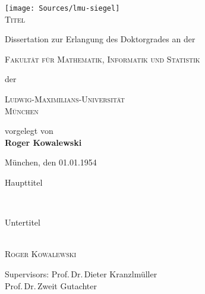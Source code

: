 
\begin{titlepage}
	\begin{center}
        \texttt{[image: Sources/lmu-siegel]}\\
        \vskip 1cm
		\textsc{\huge Titel}
                \vskip 1cm
                \begin{large}
                  Dissertation zur Erlangung des Doktorgrades an der\\[0.50cm]
                  \begin{Large}
                    \textsc{Fakultät für Mathematik, Informatik und Statistik}\\[0.50cm]
                  \end{Large}
                  der\\[0.50cm]
                  \begin{Large}
                    \textsc{Ludwig-Maximilians-Universität\\München}\par
                  \end{Large}
                \end{large}
		\vfill
                {\large vorgelegt von}\\[0.5cm]
                {\LARGE \bfseries Roger Kowalewski}
    \vskip 1cm
    \begin{small}
        München, den 01.01.1954
    \end{small}
	\end{center}
\end{titlepage}


\begin{titlepage}
  \phantom{}
  \vfill
  \begin{center}
    \begin{singlespace*}
    \begin{Huge}
     Haupttitel
    \end{Huge}\\[0.2cm]
    \begin{Large}
      Untertitel
    \end{Large}\\[1em]
      \vskip 0.25cm
      \textsc{Roger Kowalewski}\par
    \end{singlespace*}
  \end{center}
  \vfill
  \begin{singlespace*}
    Supervisors:            Prof.\,Dr.\,Dieter Kranzlmüller\\
    \phantom{Supervisors:}  Prof.\,Dr.\,Zweit Gutachter
  \end{singlespace*}
\end{titlepage}

\newpage
\null
\thispagestyle{empty}
\newpage
